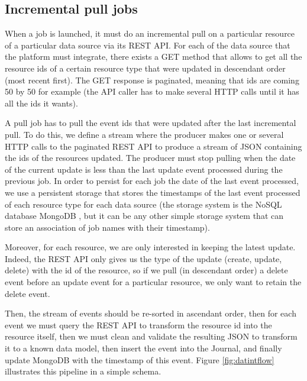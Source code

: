 \subsection{Incremental pull jobs}

When a job is launched, it must do an incremental pull on a particular resource of a particular data source via its REST API. For each of the data source that the platform must integrate, there exists
a GET method that allows to get all the resource ids of a certain resource type that were updated in descendant order (most recent first). The GET response is paginated, meaning that ids are coming 50 by 50 for example (the API caller has to make several HTTP calls until it has all the ids it wants). 

A pull job has to pull the event ids that were updated after the last incremental pull. To do this, we define a stream where the producer makes one or several HTTP calls to the paginated REST API to produce a stream of JSON containing the ids of the resources updated. The producer must stop pulling when the date of the current update is less than the last
update event processed during the previous job. In order to persist for each job the date of the last event processed, we use a persistent storage that stores the timestamps of the last event processed of each resource type for each data source (the storage system is the NoSQL database MongoDB , but it can be any other simple storage system that can store an association of job names with their timestamp).

Moreover, for each resource, we are only interested in keeping the latest update. Indeed, the REST API only gives us the type of the update (create, update, delete) with the id of the resource, so if we pull (in descendant order) a delete event before an update event for a particular resource, we only want to retain the delete event.

Then, the stream of events should be re-sorted in ascendant order, then for each event we must query the REST API to transform the resource id into the resource itself, then we must clean and validate the resulting JSON to transform it to a known data model, then insert the event into the Journal, and finally update MongoDB with the timestamp of this event.
Figure \ref{fig:datintflow} illustrates this pipeline in a simple schema. 

